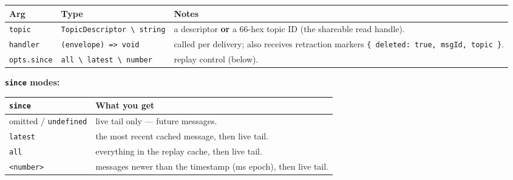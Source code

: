 \documentclass[
  nobib]{tufte-handout}
\newcounter{none} %
\begin{document}
{\def\LTcaptype{none} %
\begin{longtable}[]{@{}
  >{\raggedright\arraybackslash}p{}
  >{\raggedright\arraybackslash}p{}
  >{\raggedright\arraybackslash}p{}@{}}
\toprule\noalign{}
\begin{minipage}[b]{\linewidth}\raggedright
Arg
\end{minipage} & \begin{minipage}[b]{\linewidth}\raggedright
Type
\end{minipage} & \begin{minipage}[b]{\linewidth}\raggedright
Notes
\end{minipage} \\
\midrule\noalign{}
\endhead
\bottomrule\noalign{}
\endlastfoot
\texttt{topic} &
\texttt{TopicDescriptor\ \textbackslash{}\textbar{}\ string} & a
descriptor \textbf{or} a 66-hex topic ID (the shareable read handle). \\
\texttt{handler} & \texttt{(envelope)\ =\textgreater{}\ void} & called
per delivery; also receives retraction markers
\texttt{\{\ deleted:\ true,\ msgId,\ topic\ \}}. \\
\texttt{opts.since} &
\texttt{\textquotesingle{}all\textquotesingle{}\ \textbackslash{}\textbar{}\ \textquotesingle{}latest\textquotesingle{}\ \textbackslash{}\textbar{}\ number}
& replay control (below). \\
\end{longtable}
}

\textbf{\texttt{since} modes:}

{\def\LTcaptype{none} %
\begin{longtable}[]{@{}
  >{\raggedright\arraybackslash}p{}
  >{\raggedright\arraybackslash}p{}@{}}
\toprule\noalign{}
\begin{minipage}[b]{\linewidth}\raggedright
\texttt{since}
\end{minipage} & \begin{minipage}[b]{\linewidth}\raggedright
What you get
\end{minipage} \\
\midrule\noalign{}
\endhead
\bottomrule\noalign{}
\endlastfoot
omitted / \texttt{undefined} & live tail only --- future messages. \\
\texttt{\textquotesingle{}latest\textquotesingle{}} & the most recent
cached message, then live tail. \\
\texttt{\textquotesingle{}all\textquotesingle{}} & everything in the
replay cache, then live tail. \\
\texttt{\textless{}number\textgreater{}} & messages newer than the
timestamp (ms epoch), then live tail. \\
\end{longtable}
}
\end{document}
